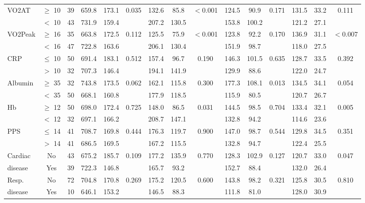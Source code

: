 \begin{sidewaystable}[p]
\begin{tabular}{l c c | c c c | c c c | c c c | c c c}
		VO2AT     & $\geq$ 10 & 39 & 659.8 & 173.1 & 0.035    & 132.6 & 85.8  & $<$0.001 & 124.5 & 90.9  & 0.171    & 131.5 & 33.2 & 0.111    \\
		          & $<$ 10    & 43 & 731.9 & 159.4 &          & 207.2 & 130.5 &          & 153.8 & 100.2 &          & 121.2 & 27.1 &  \\
		VO2Peak   & $\geq$ 16 & 35 & 663.8 & 172.5 & 0.112    & 125.5 & 75.9  & $<$0.001 & 123.8 & 92.2  & 0.170    & 136.9 & 31.1 & $<$0.007 \\
		          & $<$ 16    & 47 & 722.8 & 163.6 &          & 206.1 & 130.4 &          & 151.9 & 98.7  &          & 118.0 & 27.5 &  \\
		CRP       & $\leq$ 10 & 50 & 691.4 & 183.1 & 0.512    & 157.4 & 96.7  & 0.190    & 146.3 & 101.5 & 0.635    & 128.7 & 33.5 & 0.392    \\
		          & $>$ 10    & 32 & 707.3 & 146.4 &          & 194.1 & 141.9 &          & 129.9 & 88.6  &          & 122.0 & 24.7 &  \\
		Albumin   & $\geq$ 35 & 32 & 743.8 & 173.5 & 0.062    & 162.1 & 115.8 & 0.300    & 177.3 & 108.1 & 0.013    & 134.5 & 34.1 & 0.054    \\
		          & $<$ 35    & 50 & 668.1 & 160.8 &          & 177.9 & 118.5 &          & 115.9 & 80.5  &          & 120.7 & 26.7 &  \\
		Hb        & $\geq$ 12 & 50 & 698.0 & 172.4 & 0.725    & 148.0 & 86.5  & 0.031    & 144.5 & 98.5  & 0.704    & 133.4 & 32.1 & 0.005    \\
		          & $<$ 12    & 32 & 697.1 & 166.2 &          & 208.7 & 147.1 &          & 132.8 & 94.2  &          & 114.6 & 23.6 &  \\
		PPS       & $\leq$ 14 & 41 & 708.7 & 169.8 & 0.444    & 176.3 & 119.7 & 0.900    & 147.0 & 98.7  & 0.544    & 129.8 & 34.5 & 0.351    \\
		          & $>$ 14    & 41 & 686.5 & 169.5 &          & 167.2 & 115.5 &          & 132.8 & 94.7  &          & 122.4 & 25.5 &  \\
		Cardiac   & No        & 43 & 675.2 & 185.7 & 0.109    & 177.2 & 135.9 & 0.770    & 128.3 & 102.9 & 0.127    & 120.7 & 33.0 & 0.047    \\
		disease   & Yes       & 39 & 722.3 & 146.8 &          & 165.7 & 93.2  &          & 152.7 & 88.4  &          & 132.0 & 26.4 &  \\
		Resp.     & No        & 72 & 704.8 & 170.8 & 0.269    & 175.2 & 120.5 & 0.600    & 143.8 & 98.2  & 0.321    & 125.8 & 30.5 & 0.810    \\
		disease   & Yes       & 10 & 646.1 & 153.2 &          & 146.5 & 88.3  &          & 111.8 & 81.0  &          & 128.0 & 30.9 &
	\end{tabular}
\end{sidewaystable}